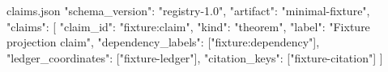 \begin{filecontents*}[overwrite]{claims.json}
{
  "schema_version": "registry-1.0",
  "artifact": "minimal-fixture",
  "claims": [
    {
      "claim_id": "fixture:claim",
      "kind": "theorem",
      "label": "Fixture projection claim",
      "dependency_labels": ["fixture:dependency"],
      "ledger_coordinates": ["fixture-ledger"],
      "citation_keys": ["fixture-citation"]
    }
  ]
}
\end{filecontents*}
